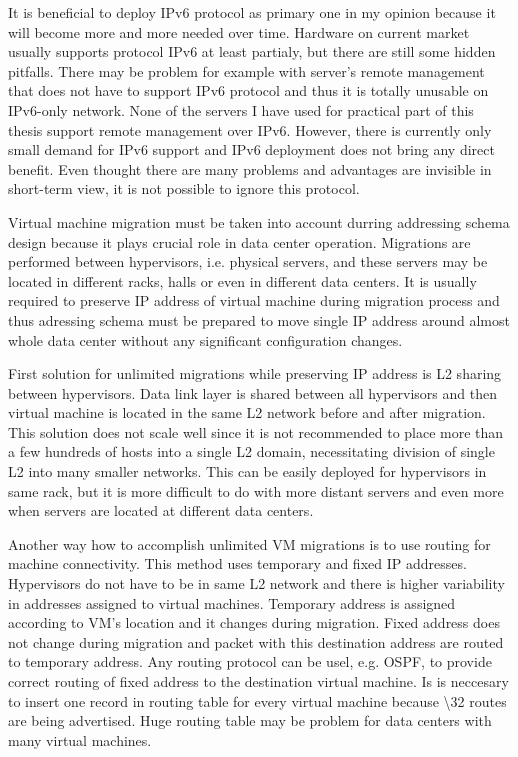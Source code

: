 It is beneficial to deploy \Ac{IPv6} protocol as primary one in my opinion because it will become more and more needed over time. Hardware on current market usually supports protocol \Ac{IPv6} at least partialy, but there are still some hidden pitfalls. There may be problem for example with server's remote management that does not have to support \Ac{IPv6} protocol and thus it is totally unusable on \Ac{IPv6}-only network. None of the servers I have used for practical part of this thesis support remote management over \Ac{IPv6}. 
However, there is currently only small demand for \Ac{IPv6} support and \Ac{IPv6} deployment does not bring any direct benefit. Even thought there are many problems and advantages are invisible in short-term view, it is not possible to ignore this protocol.

Virtual machine migration must be taken into account durring addressing schema design because it plays crucial role in data center operation. Migrations are performed between hypervisors, i.e. physical servers, and these servers may be located in different racks, halls or even in different data centers. It is usually required to preserve \Ac{IP} address of virtual machine during migration process and thus adressing schema must be prepared to move single \Ac{IP} address around almost whole data center without any significant configuration changes. 

First solution for unlimited migrations while preserving \Ac{IP} address is L2 sharing between hypervisors. Data link layer is shared between all hypervisors and then virtual machine is located in the same L2 network before and after migration. This solution does not scale well since it is not recommended to place more than a few hundreds of hosts into a single L2 domain, necessitating division of single L2 into many smaller networks. This can be easily deployed for hypervisors in same rack, but it is more difficult to do with more distant servers and even more when servers are located at different data centers.

Another way how to accomplish unlimited \Ac{VM} migrations is to use routing for machine connectivity. This method uses temporary and fixed \Ac{IP} addresses. Hypervisors do not have to be in same L2 network and there is higher variability in addresses assigned to virtual machines. Temporary address is assigned according to \Ac{VM}'s location and it changes during migration. Fixed address does not change during migration and packet with this destination address are routed to temporary address. Any routing protocol can be usel, e.g. \Ac{OSPF}, to provide correct routing of fixed address to the destination virtual machine. Is is neccesary to insert one record in routing table for every virtual machine because \textbackslash 32 routes are being advertised. Huge routing table may be problem for data centers with many virtual machines.

